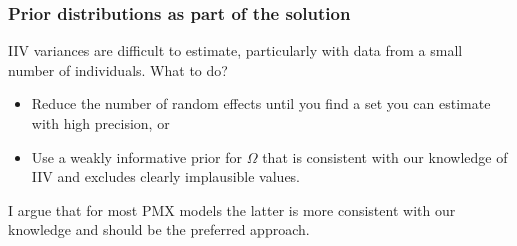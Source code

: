 \documentclass[handout]{beamer}
\begin{document}
\begin{frame}
  \frametitle{Prior distributions as part of the solution}
  
IIV variances are difficult to estimate, particularly with
    data from a small number of individuals. What to do?
  \begin{itemize}
  \item Reduce the number of random effects until you find a set you
    can estimate with high precision, or
\item Use a weakly informative prior for $\Omega$ that is consistent
  with our knowledge of IIV and excludes clearly
  implausible values.
  \end{itemize}
I argue that for most PMX models the latter is more consistent with
our knowledge and should be the preferred approach.



\end{frame}






  



\end{document}
